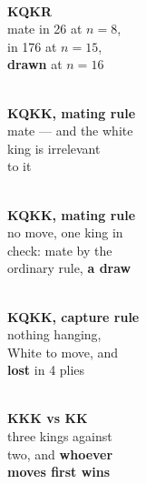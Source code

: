\documentclass[11pt]{article}
\begin{document}
\begin{center}
\begin{minipage}{0.19\textwidth}\centering
  \\[1.2mm]
  {\scriptsize\color{kqkr}\textbf{KQKR}\\mate in 26 at $n=8$,\\in 176 at $n=15$,\\\textbf{drawn} at $n=16$}
\end{minipage}\hfill
\begin{minipage}{0.19\textwidth}\centering
  \\[1.2mm]
  {\scriptsize\color{kqkk}\textbf{KQKK, mating rule}\\mate --- and the white\\king is irrelevant\\to it}
\end{minipage}\hfill
\begin{minipage}{0.19\textwidth}\centering
  \\[1.2mm]
  {\scriptsize\color{inksoft}\textbf{KQKK, mating rule}\\no move, one king in\\check: mate by the\\ordinary rule, \textbf{a draw}}
\end{minipage}\hfill
\begin{minipage}{0.19\textwidth}\centering
  \\[1.2mm]
  {\scriptsize\color{kqkk}\textbf{KQKK, capture rule}\\nothing hanging,\\White to move, and\\\textbf{lost} in 4 plies}
\end{minipage}\hfill
\begin{minipage}{0.19\textwidth}\centering
  \\[1.2mm]
  {\scriptsize\color{kings}\textbf{KKK vs KK}\\three kings against\\two, and \textbf{whoever}\\\textbf{moves first wins}}
\end{minipage}
\end{center}
\end{document}
